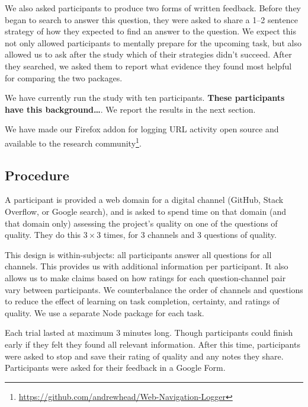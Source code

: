 We also asked participants to produce two forms of written feedback.
Before they began to search to answer this question, they were asked to share a 1--2 sentence strategy of how they expected to find an answer to the question.
We expect this not only allowed participants to mentally prepare for the upcoming task, but also allowed us to ask after the study which of their strategies didn't succeed.
After they searched, we asked them to report what evidence they found most helpful for comparing the two packages.

We have currently run the study with ten participants.
\textbf{These participants have this background\ldots{}}.
We report the results in the next section.

We have made our Firefox addon for logging URL activity open source and available to the research community\footnote{\url{https://github.com/andrewhead/Web-Navigation-Logger}}.


\subsection{Procedure}

A participant is provided a web domain for a digital channel (GitHub, Stack Overflow, or Google search), and is asked to spend time on that domain (and that domain only) assessing the project's quality on one of the questions of quality.
They do this $3\times3$ times, for 3 channels and 3 questions of quality.

This design is within-subjects: all participants answer all questions for all channels.
This provides us with additional information per participant.
It also allows us to make claims based on how ratings for each question-channel pair vary between participants.
We counterbalance the order of channels and questions to reduce the effect of learning on task completion, certainty, and ratings of quality.
We use a separate Node package for each task.

Each trial lasted at maximum 3 minutes long.
Though participants could finish early if they felt they found all relevant information.
After this time, participants were asked to stop and save their rating of quality and any notes they share.
Participants were asked for their feedback in a Google Form.


